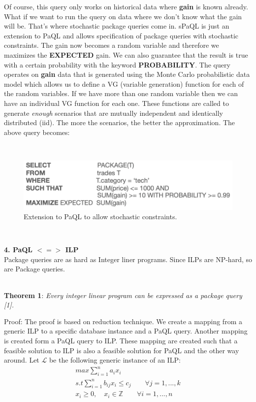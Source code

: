 \documentclass[a4paper,12pt]{article}
\begin{document}
Of course, this query only works on historical data where \textbf{gain} is known already. What if we want to run the query on data where we don't know what the gain will be. That's where stochastic package queries come in. sPaQL is just an extension to PaQL and allows specification of package queries with stochastic constraints. The gain now becomes a random variable and therefore we maximizes the \textbf{EXPECTED} gain. We can also guarantee that the result is true with a certain probability with the keyword \textbf{PROBABILITY}. The query operates on \textbf{gain} data that is generated using the Monte Carlo probabilistic data model which allows us to define a VG (variable generation) function for each of the random variables. If we have more than one random variable then we can have an individual VG function for each one. These functions are called to generate \textit{enough} scenarios that are mutually independent and identically distributed (iid). The more the scenarios, the better the approximation.  The above query becomes:  

\\
\begin{figure}[h]
\includegraphics[scale=.7]{4}
\caption{Extension to PaQL to allow stochastic constraints.}
\centering
\end{figure}
\\
\vspace{5mm}

\textbf{4. PaQL $<=>$ ILP}
\\

Package queries are as hard as Integer liner programs. Since ILPs are NP-hard, so are Package queries.
\\

\\
{\small \textbf{Theorem 1}: \textit{ Every integer linear program can be expressed as a package query [1].}\par}

Proof: The proof is based on reduction technique. We create a mapping from a generic ILP to a specific database instance and a PaQL query. Another mapping is created form a PaQL query to ILP. These mapping are created such that a feasible solution to ILP is also a feasible solution for PaQL and the other way around. Let $\mathcal{L}$ be the following generic instance of an ILP:
\\
\begin{gather}
    max \sum_{i=1}^{n} a_i x_i \\
    s.t \sum_{i=1}^{n} b_{ij} x_i \leq c_j \qquad   \forall j = 1,...,k \\
        x_i \geq 0, \quad x_i \in \mathbb{Z} \qquad   \forall i = 1,...,n
\end{gather}
\end{document}
